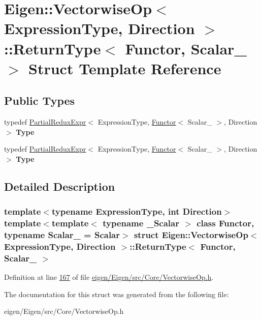 \hypertarget{struct_eigen_1_1_vectorwise_op_1_1_return_type}{}\section{Eigen\+:\+:Vectorwise\+Op$<$ Expression\+Type, Direction $>$\+:\+:Return\+Type$<$ Functor, Scalar\+\_\+ $>$ Struct Template Reference}
\label{struct_eigen_1_1_vectorwise_op_1_1_return_type}
\subsection*{Public Types}
\begin{DoxyCompactItemize}
\item 
\mbox{\label{struct_eigen_1_1_vectorwise_op_1_1_return_type_a980e83210b2fceea517d74a0d3a8d783}} 
typedef \hyperlink{group___core___module_class_eigen_1_1_partial_redux_expr}{Partial\+Redux\+Expr}$<$ Expression\+Type, \hyperlink{struct_functor}{Functor}$<$ Scalar\+\_\+ $>$, Direction $>$ {\bfseries Type}
\item 
\mbox{\label{struct_eigen_1_1_vectorwise_op_1_1_return_type_a980e83210b2fceea517d74a0d3a8d783}} 
typedef \hyperlink{group___core___module_class_eigen_1_1_partial_redux_expr}{Partial\+Redux\+Expr}$<$ Expression\+Type, \hyperlink{struct_functor}{Functor}$<$ Scalar\+\_\+ $>$, Direction $>$ {\bfseries Type}
\end{DoxyCompactItemize}


\subsection{Detailed Description}
\subsubsection*{template$<$typename Expression\+Type, int Direction$>$\newline
template$<$template$<$ typename \+\_\+\+Scalar $>$ class Functor, typename Scalar\+\_\+ = Scalar$>$\newline
struct Eigen\+::\+Vectorwise\+Op$<$ Expression\+Type, Direction $>$\+::\+Return\+Type$<$ Functor, Scalar\+\_\+ $>$}



Definition at line \hyperlink{eigen_2_eigen_2src_2_core_2_vectorwise_op_8h_source_l00167}{167} of file \hyperlink{eigen_2_eigen_2src_2_core_2_vectorwise_op_8h_source}{eigen/\+Eigen/src/\+Core/\+Vectorwise\+Op.\+h}.



The documentation for this struct was generated from the following file\+:\begin{DoxyCompactItemize}
\item 
eigen/\+Eigen/src/\+Core/\+Vectorwise\+Op.\+h\end{DoxyCompactItemize}
